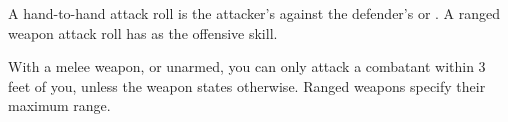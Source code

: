 
A hand-to-hand attack roll is the attacker's  against the defender's  or . A ranged weapon attack roll has  as the offensive skill.

With a melee weapon, or unarmed, you can only attack a combatant within 3 feet of you, unless the weapon states otherwise. Ranged weapons specify their maximum range.
